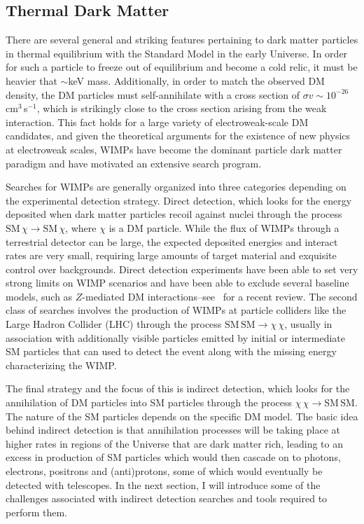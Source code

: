 \subsection{Thermal Dark Matter}

There are several general and striking features pertaining to dark matter particles in thermal equilibrium with the Standard Model in the early Universe. In order for such a particle to freeze out of equilibrium and become a cold relic, it must be heavier that $\sim$keV mass. Additionally, in order to match the observed DM density, the DM particles must self-annihilate with a cross section of $\sigma v\sim 10^{-26}$\,cm$^3$\,s$^{-1}$, which is strikingly close to the cross section arising from the weak interaction. This fact holds for a large variety of electroweak-scale DM candidates, and given the theoretical arguments for the existence of new physics at electroweak scales, WIMPs have become the dominant particle dark matter paradigm and have motivated an extensive search program.

Searches for WIMPs are generally organized into three categories depending on the experimental detection strategy. Direct detection, which looks for the energy deposited when dark matter particles recoil against nuclei through the process $\text{SM}\,\chi\rightarrow\text{SM}\,\chi$, where $\chi$ is a DM particle. While the flux of WIMPs through a terrestrial detector can be large, the expected deposited energies and interact rates are very small, requiring large amounts of target material and exquisite control over backgrounds. Direct detection experiments have been able to set very strong limits on WIMP scenarios and have been able to exclude several baseline models, such as $Z$-mediated DM interactions--see~\cite{} for a recent review. The second class of searches involves the production of WIMPs at particle colliders like the Large Hadron Collider (LHC) through the process $\mathrm{SM}\,\mathrm{SM}\rightarrow\chi\,\chi$, usually in association with additionally visible particles emitted by initial or intermediate SM particles that can used to detect the event along with the missing energy characterizing the WIMP. 

The final strategy and the focus of this is indirect detection, which looks for the annihilation of DM particles into SM particles through the process $\chi\,\chi\rightarrow\mathrm{SM}\,\mathrm{SM}$. The nature of the SM particles depends on the specific DM model. The basic idea behind indirect detection is that annihilation processes will be taking place at higher rates in regions of the Universe that are dark matter rich, leading to an excess in production of SM particles which would then cascade on to photons, electrons, positrons and (anti)protons, some of which would eventually be detected with telescopes. In the next section, I will introduce some of the challenges associated with indirect detection searches and tools required to perform them. 

